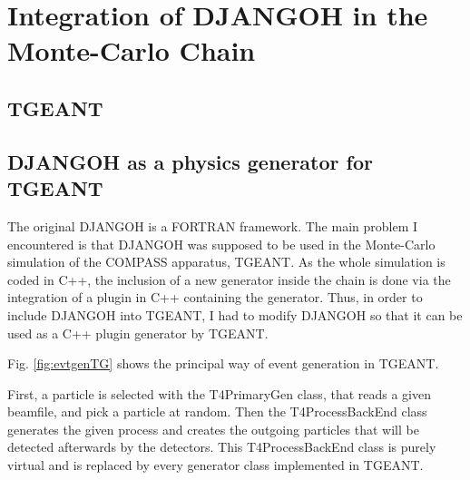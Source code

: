 
\chapter{Integration of DJANGOH in the Monte-Carlo Chain} %

\label{ch:MC} %


\section{TGEANT}



\section{DJANGOH as a physics generator for TGEANT}

The original DJANGOH is a FORTRAN framework. The main problem I encountered is that
DJANGOH was supposed to be used in the Monte-Carlo simulation of the COMPASS apparatus,
TGEANT. As the whole simulation is coded in C++, the inclusion of a new generator inside
the chain is done via the integration of a plugin in C++ containing the generator.
Thus, in order to include DJANGOH into TGEANT, I had to modify DJANGOH so that it
can be used as a C++ plugin generator by TGEANT.

Fig. \ref{fig:evtgenTG} shows the principal way of event generation in TGEANT.

First, a particle is selected with the T4PrimaryGen class, that reads a given beamfile,
and pick a particle at random. Then the T4ProcessBackEnd class generates
the given process and creates the outgoing particles that will be detected afterwards
by the detectors. This T4ProcessBackEnd class is purely virtual and is replaced by
every generator class implemented in TGEANT.

